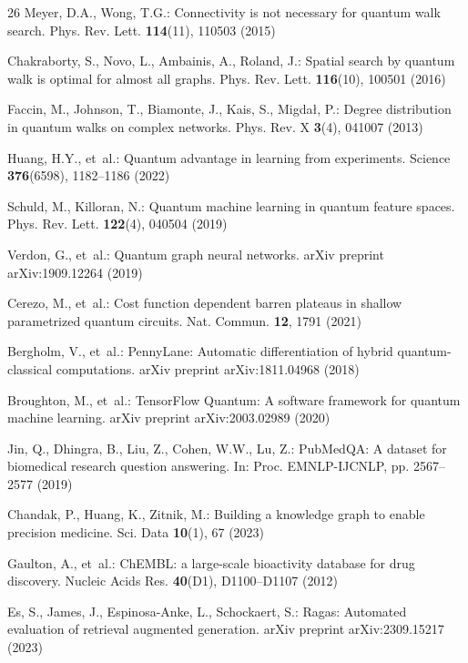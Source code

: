 \documentclass{llncs}
\begin{document}
\begin{thebibliography}{26}
Meyer, D.A., Wong, T.G.: Connectivity is not necessary for quantum walk search. Phys. Rev. Lett. \textbf{114}(11), 110503 (2015)

Chakraborty, S., Novo, L., Ambainis, A., Roland, J.: Spatial search by quantum walk is optimal for almost all graphs. Phys. Rev. Lett. \textbf{116}(10), 100501 (2016)

Faccin, M., Johnson, T., Biamonte, J., Kais, S., Migda{\l}, P.: Degree distribution in quantum walks on complex networks. Phys. Rev. X \textbf{3}(4), 041007 (2013)

Huang, H.Y., et~al.: Quantum advantage in learning from experiments. Science \textbf{376}(6598), 1182--1186 (2022)

Schuld, M., Killoran, N.: Quantum machine learning in quantum feature spaces. Phys. Rev. Lett. \textbf{122}(4), 040504 (2019)

Verdon, G., et~al.: Quantum graph neural networks. arXiv preprint arXiv:1909.12264 (2019)

Cerezo, M., et~al.: Cost function dependent barren plateaus in shallow parametrized quantum circuits. Nat. Commun. \textbf{12}, 1791 (2021)

Bergholm, V., et~al.: PennyLane: Automatic differentiation of hybrid quantum-classical computations. arXiv preprint arXiv:1811.04968 (2018)

Broughton, M., et~al.: TensorFlow Quantum: A software framework for quantum machine learning. arXiv preprint arXiv:2003.02989 (2020)

Jin, Q., Dhingra, B., Liu, Z., Cohen, W.W., Lu, Z.: PubMedQA: A dataset for biomedical research question answering. In: Proc. EMNLP-IJCNLP, pp. 2567--2577 (2019)

Chandak, P., Huang, K., Zitnik, M.: Building a knowledge graph to enable precision medicine. Sci. Data \textbf{10}(1), 67 (2023)

Gaulton, A., et~al.: ChEMBL: a large-scale bioactivity database for drug discovery. Nucleic Acids Res. \textbf{40}(D1), D1100--D1107 (2012)

Es, S., James, J., Espinosa-Anke, L., Schockaert, S.: Ragas: Automated evaluation of retrieval augmented generation. arXiv preprint arXiv:2309.15217 (2023)

\end{thebibliography}
\end{document}
